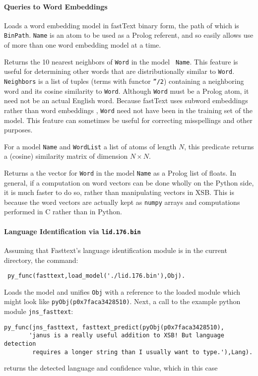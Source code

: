 \paragraph{Queries to Word Embeddings}
\begin{description}
  Loads a word embedding model in fastText binary form, the path of
  which is {\tt BinPath}.  {\tt Name} is an atom to be used as a
  Prolog referent, and so easily allows use of more than one word
  embedding model at a time.

  Returns the 10 nearest neighbors of {\tt Word} in the model {\tt
    Name}.  This feature is useful for determining other words that
  are distributionally similar to {\tt Word}.  {\tt Neighbors} is a
  list of tuples (terms with functor {\tt ''/2}) containing a
  neighboring word and its cosine similarity to {\tt Word}.   Although
  {\tt Word} must be a Prolog atom, it need not be an actual English
  word.  Because fastText uses subword embeddings rather than word
  embeddings \cite{BGJM17}, {\tt Word} need not have been in the
  training set of the model.  This feature can sometimes be useful for
  correcting misspellings and other purposes.

  For a model {\tt Name} and {\tt WordList} a list of atoms of length
  $N$, this predicate returns a (cosine) similarity matrix of
  dimension $N \times N$.
    
  Returns a the vector for {\tt Word} in the model {\tt Name} as a
  Prolog list of floats.  In general, if a computation on word vectors
  can be done wholly on the Python side, it is much faster to do so,
  rather than manipulating vectors in XSB.  This is because the word
  vectors are actually kept as {\tt numpy} arrays and computations
  performed in C rather than in Python.
\end{description}

\paragraph{Language Identification via {\tt lid.176.bin}}
Assuming that Fasttext's language identification module is in the
current directory, the command:
\begin{verbatim}
 py_func(fasttext,load_model('./lid.176.bin'),Obj).
\end{verbatim}
Loads the model and unifies {\tt Obj} with a reference to the loaded
module which might look like {\tt pyObj(p0x7faca3428510)}.  
Next, a call to the example python module {\tt jns\_fasttext}:
\begin{verbatim}
py_func(jns_fasttext, fasttext_predict(pyObj(p0x7faca3428510),
       'janus is a really useful addition to XSB! But language detection
        requires a longer string than I usually want to type.'),Lang).  
\end{verbatim}
returns the detected language and confidence value, which in this case

